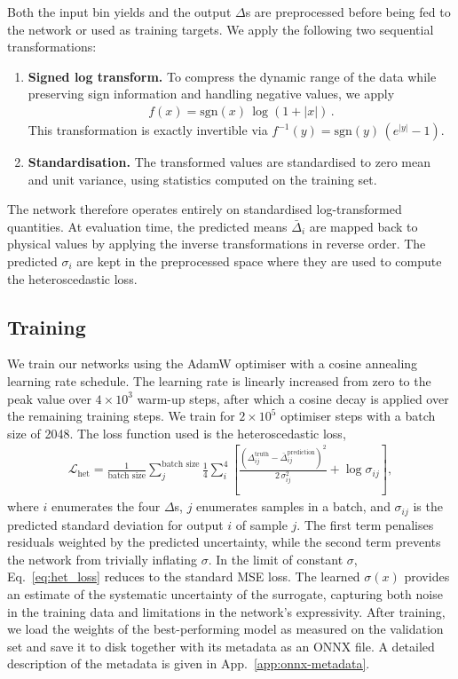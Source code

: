 Both the input bin yields and the output $\Delta$s are preprocessed before
being fed to the network or used as training targets. We apply the following
two sequential transformations:
%
\begin{enumerate}
  \item \textbf{Signed log transform.} To compress the dynamic range of the
    data while preserving sign information and handling negative values, we
    apply
    \begin{align}
      f(x) = \mathrm{sgn}(x)\,\log(1 + |x|)\,.
      \label{eq:log_trafo}
    \end{align}
    This transformation is exactly invertible via
    $f^{-1}(y) = \mathrm{sgn}(y)\,(e^{|y|}-1)$.
  \item \textbf{Standardisation.} The transformed values are standardised to
    zero mean and unit variance, using statistics computed on the training set.
\end{enumerate}
%
The network therefore operates entirely on standardised log-transformed
quantities. At evaluation time, the predicted means $\bar\Delta_i$ are mapped
back to physical values by applying the inverse transformations in reverse
order. The predicted $\sigma_i$ are kept in the preprocessed space where they
are used to compute the heteroscedastic loss.

\subsection{Training}
\label{sec:training}

We train our networks using the AdamW optimiser with a cosine annealing
learning rate schedule. The learning rate is linearly increased from zero to
the peak value over $4\times10^3$ warm-up steps, after which a cosine decay
is applied over the remaining training steps. We train for $2\times10^5$
optimiser steps with a batch size of 2048. The loss function used is the
heteroscedastic loss,
%
\begin{align}
    \mathcal{L}_\mathrm{het}
    = \frac{1}{\text{batch size}}
      \sum_j^{\text{batch size}}
      \frac{1}{4}\sum_{i}^{4}
      \left[
        \frac{\left(\Delta_{ij}^\mathrm{truth} -
        \bar\Delta_{ij}^\mathrm{prediction}\right)^2}
        {2\,\sigma_{ij}^2}
        + \log \sigma_{ij}
      \right],
    \label{eq:het_loss}
\end{align}
%
where $i$ enumerates the four $\Delta$s, $j$ enumerates samples in a batch,
and $\sigma_{ij}$ is the predicted standard deviation for output $i$ of sample
$j$. The first term penalises residuals weighted by the predicted uncertainty,
while the second term prevents the network from trivially inflating $\sigma$.
In the limit of constant $\sigma$, Eq.~\eqref{eq:het_loss} reduces to the
standard MSE loss. The learned $\sigma(x)$ provides an estimate of the
systematic uncertainty of the surrogate, capturing both noise in the training
data and limitations in the network's expressivity. After training, we load
the weights of the best-performing model as measured on the validation set
and save it to disk together with its metadata as an ONNX file. A detailed
description of the metadata is given in App.~\ref{app:onnx-metadata}.
